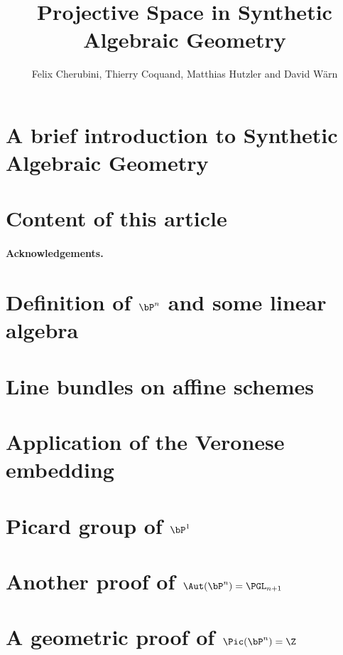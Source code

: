 \documentclass{../util/zariski-small}
\title{Projective Space in Synthetic Algebraic Geometry}
\begin{document}
\author{Felix Cherubini, Thierry Coquand, Matthias Hutzler and David Wärn}

\maketitle

\section*{A brief introduction to Synthetic Algebraic Geometry}


\section*{Content of this article}

\paragraph{Acknowledgements.}


\section[Definition of projective space and some linear algebra]{Definition of $\bP^n$ and some linear algebra}


%

\section{Line bundles on affine schemes}


\section{Application of the Veronese embedding}


\section[Picard group of projective space]{Picard group of $\bP^1$}


\section[Automorphism group of projective space]{Another proof of $\Aut(\bP^n) = \PGL_{n+1}$}


\section[Picard group of projective space (geometric)]{A geometric proof of $\Pic(\bP^n)=\Z$}
\label{geometric-proof}


\newpage



\printindex

\printbibliography
\end{document}
